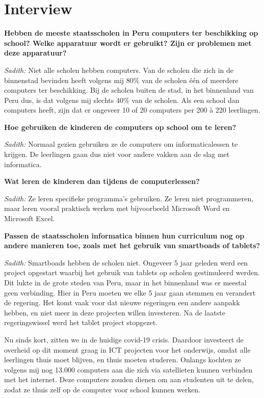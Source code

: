 \section{Interview}
\textbf{Hebben de meeste staatsscholen in Peru computers ter beschikking op school? Welke apparatuur wordt er gebruikt? Zijn er problemen met deze apparatuur?}

\textit{Sadith:} Niet alle scholen hebben computers. Van de scholen die zich in de binnenstad bevinden heeft volgens mij 80\% van de scholen één of meerdere computers ter beschikking. Bij de scholen buiten de stad, in het binnenland van Peru dus, is dat volgens mij slechts 40\% van de scholen. Als een school dan computers heeft, zijn dat er ongeveer 10 of 20 computers per 200 à 220 leerlingen.

\textbf{Hoe gebruiken de kinderen de computers op school om te leren?}

\textit{Sadith:} Normaal gezien gebruiken ze de computers om informaticalessen te krijgen. De leerlingen gaan dus niet voor andere vakken aan de slag met informatica. 

\textbf{Wat leren de kinderen dan tijdens de computerlessen?}

\textit{Sadith:} Ze leren specifieke programma's gebruiken. Ze leren niet programmeren, maar leren vooral praktisch werken met bijvoorbeeld Microsoft Word en Microsoft Excel.

\textbf{Passen de staatsscholen informatica binnen hun curriculum nog op andere manieren toe, zoals met het gebruik van smartboads of tablets?}

\textit{Sadith:} Smartboads hebben de scholen niet. Ongeveer 5 jaar geleden werd een project opgestart waarbij het gebruik van tablets op scholen gestimuleerd werden. Dit lukte in de grote steden van Peru, maar in het binnenland was er meestal geen verbinding. Hier in Peru moeten we elke 5 jaar gaan stemmen en verandert de regering. Het komt vaak voor dat nieuwe regeringen een andere aanpakk hebben, en niet meer in deze projecten willen investeren. Na de laatste regeringswissel werd het tablet project stopgezet.

Nu sinds kort, zitten we in de huidige covid-19 crisis. Daardoor investeert de overheid op dit moment graag in ICT projecten voor het onderwijs, omdat alle leerlingen thuis moet blijven, en thuis moeten studeren. Onlangs kochten ze volgens mij nog 13.000 computers aan die zich via satellieten kunnen verbinden met het internet. Deze computers zouden dienen om aan studenten uit te delen, zodat ze thuis zelf op de computer voor school kunnen werken. 

